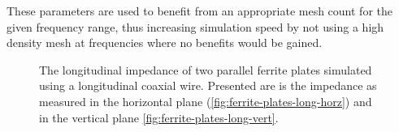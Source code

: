 \documentclass[review, number, sort&compress]{elsarticle}
\begin{document}
These parameters are used to benefit from an appropriate mesh count for the given frequency range, thus increasing simulation speed by not using a high density mesh at frequencies where no benefits would be gained.

\begin{figure}
\caption{The longitudinal impedance of two parallel ferrite plates simulated using a longitudinal coaxial wire. Presented are is the impedance as measured in the horizontal plane (\ref{fig:ferrite-plates-long-horz}) and in the vertical plane \ref{fig:ferrite-plates-long-vert}.}
\label{fig:ferrite-plates-long}
\end{figure}
\end{document}
